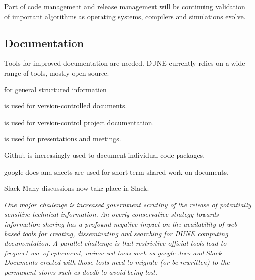 \documentclass[../main-v1.tex]{subfiles}
\begin{document}
Part of code management and release management will be continuing validation of important algorithms as operating systems, compilers and simulations evolve. 



\subsection{Documentation}
Tools for improved documentation are needed. DUNE currently relies on a wide range of tools, mostly open source.

\begin{description}
\item[Mediawiki] for general structured information
\item[docdb]  is used for version-controlled documents. 
\item[edms]  is used for version-control project documentation.
\item[indico]  is used for presentations and meetings. 
\item[github] Github is increasingly used to document individual code packages.
\item[google tools] google docs and sheets are used for short term shared work on documents.
\item{Slack}  Many discussions now take place in Slack.


\end{description}

{\it One major challenge is increased government  scrutiny of the release of potentially sensitive technical information.  An overly conservative strategy towards information sharing has a profound negative impact on the availability of web-based tools for creating, disseminating and searching for DUNE computing documentation. A parallel  challenge is that restrictive official tools lead to frequent use of ephemeral, unindexed tools such as google docs and Slack.  Documents created with those tools need to migrate (or be rewritten) to the permanent stores such as docdb to avoid being lost.  } 


\end{document}
